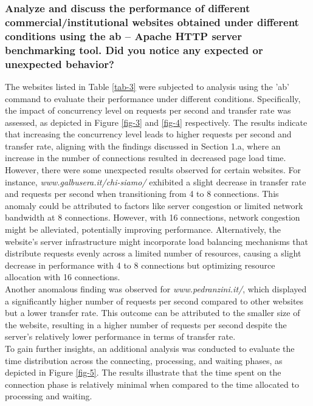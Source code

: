 \documentclass[eng]{class}
\begin{document}
\subsubsection*{Analyze and discuss the performance of different commercial/institutional websites obtained
  under different conditions using the ab – Apache HTTP server benchmarking tool. Did you
  notice any expected or unexpected behavior?}
The websites listed in Table \ref{tab-3} were subjected to analysis using the 'ab' command to evaluate their performance under different conditions.
Specifically, the impact of concurrency level on requests per second and transfer rate was assessed, as depicted in Figure \ref*{fig-3} and \ref*{fig-4} respectively.
The results indicate that increasing the concurrency level leads to higher requests per second and transfer rate,
aligning with the findings discussed in Section 1.a, where an increase in the number of connections resulted in decreased page load time.\\
However, there were some unexpected results observed for certain websites. For instance, \textit{www.galbusera.it/chi-siamo/}
exhibited a slight decrease in transfer rate and requests per second when transitioning from 4 to 8 connections.
This anomaly could be attributed to factors like server congestion or limited network bandwidth at 8 connections.
However, with 16 connections, network congestion might be alleviated, potentially improving performance.
Alternatively, the website's server infrastructure might incorporate load balancing mechanisms that distribute requests evenly across
a limited number of resources, causing a slight decrease in performance with 4 to 8 connections but optimizing resource allocation with 16 connections.\\
Another anomalous finding was observed for \textit{www.pedranzini.it/}, which displayed a significantly higher number of
requests per second compared to other websites but a lower transfer rate. This outcome can be attributed to the smaller size of the website,
resulting in a higher number of requests per second despite the server's relatively lower performance in terms of transfer rate.\\
\noindent
To gain further insights, an additional analysis was conducted to evaluate the time distribution across the connecting, processing, and waiting phases,
as depicted in Figure \ref*{fig-5}.
The results illustrate that the time spent on the connection phase is relatively minimal when compared to the time allocated to processing and waiting.\\
\end{document}
